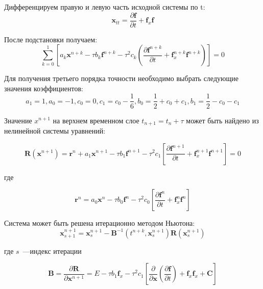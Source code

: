 Дифференцируем правую и левую часть исходной системы по t:
\begin{equation}
\mathbf{x}_{tt}=\frac{\partial \mathbf{f}}{\partial t}+\mathbf{f}_{x}\mathbf{f}
\end{equation}

После подстановки получаем:
\begin{equation}
\sum_{k=0}^{1}\left[a_{k}\mathbf{x}^{n+k}-\tau b_{k}\mathbf{f}^{n+k}-\tau^{2}c_{k}\left(\frac{\partial \mathbf{f}^{n+k}}{\partial t}+\mathbf{f}_{x}^{n+k}\mathbf{f}^{n+k}\right)\right]=0
\end{equation}

Для получения третьего порядка точности необходимо выбрать следующие значения коэффициентов:
\begin{equation}
a_{1}=1, a_{0}=-1, c_{0}=0, c_{1}=c_{0}-\frac{1}{6},
b_{0}=\frac{1}{2}+c_{0}+c_{1}, b_{1}=\frac{1}{2}-c_{0}-c_{1}
\end{equation}

Значение \( x^{n+1}\) на верхнем временном слое $t_{n+1} = t_n+\tau$ может быть найдено из нелинейной системы уравнений:

\begin{equation}
\mathbf{R}\left(\mathbf{x}^{n+1}\right)=\mathbf{r}^{n}+a_{1}\mathbf{x}^{n+1}-\tau b_{1}\mathbf{f}^{n+1}-\tau^{2}c_{1}\left[\frac{\partial\mathbf{f}^{n+1}}{\partial t}+\mathbf{f}_{x}^{n+1}\mathbf{f}^{n+1}\right]=0
\end{equation}

где

\begin{equation}
\mathbf{r}^{n}=a_{0}\mathbf{x}^{n}-\tau b_{0}\mathbf{f}^{n}-\tau^{2}c_{0}\left[\frac{\partial\mathbf{f}^{n}}{\partial t}+\mathbf{f}_{x}^{n}\mathbf{f}^{n}\right]
\end{equation}

Система может быть решена итерационно методом Ньютона:
\begin{equation}\label{eq:iter_Obreshkov}
\mathbf{x}_{s+1}^{n+1}=\mathbf{x}_{s}^{n+1}-\mathbf{B}^{-1}\left(t^{n+k}, \mathbf{x}_{s}^{n+1}\right)\mathbf{R}\left(\mathbf{x}_{s}^{n+1}\right)
\end{equation}

где $s$~---индекс итерации

\begin{equation}
\mathbf{B}=\frac{\partial\mathbf{R}}{\partial\mathbf{x}^{n+1}}=E-\tau b_{1}\mathbf{f}_{x}-\tau^{2}c_{1}\left[\frac{\partial}{\partial \mathbf{x}}\left(\frac{\partial\mathbf{f}}{\partial t}\right)+\mathbf{f}_{x}\mathbf{f}_{x}+\mathbf{C}\right]
\end{equation}

